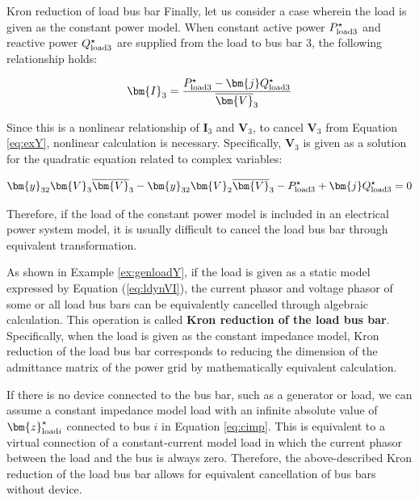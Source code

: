\documentclass[graybox, envcountchap]{svmult}
\begin{document}
\begin{example}{Kron reduction of load bus bar}
Finally, let us consider a case wherein the load is given as the constant power
model. When constant active power $P_{{\rm load}3}^{\star}$ and reactive
power $Q_{{\rm load}3}^{\star}$ are supplied from the load to bus bar 3, the
following relationship holds:

\begin{equation*}
  \bm{I}_3 = \frac{P_{{\rm load}3}^{\star} - \bm{j} Q_{{\rm load}3}^{\star} }{\overline{\bm{V}}_3}
\end{equation*}

Since this is a nonlinear relationship of $\bm{I}_3$ and $\bm{V}_3$, to cancel
$\bm{V}_3$ from Equation \ref{eq:exY}, nonlinear calculation is necessary.
Specifically, $\bm{V}_3$ is given as a solution for the quadratic equation
related to complex variables:

\begin{equation*}
  \bm{y}_{32} \bm{V}_3 \overline{\bm{V}}_3 - \bm{y}_{32}  \bm{V}_2 \overline{\bm{V}}_3 -P_{{\rm load}3}^{\star} 
  + \bm{j} Q_{{\rm load}3}^{\star} =0
\end{equation*}

Therefore, if the load of the constant power model is included in an electrical
power system model, it is usually difficult to cancel the load bus bar through
equivalent transformation.

\end{example}

As shown in Example \ref{ex:genloadY}, if the load is given as a static model
expressed by Equation (\ref{eq:ldynVI}), the current phasor and voltage phasor
of some or all load bus bars can be equivalently cancelled through algebraic
calculation. This operation is called \textbf{Kron reduction of the load bus
bar}. Specifically, when the load is given as the constant impedance model,
Kron reduction of the load bus bar corresponds to reducing the dimension of the
admittance matrix of the power grid by mathematically equivalent calculation.

If there is no device connected to the bus bar, such as a generator or load,
we can assume a constant impedance model load with an infinite absolute value of
$\bm{z}_{{\rm load}i}^{\star}$ connected to bus $i$ in Equation \ref{eq:cimp}.
This is equivalent to a virtual connection of a constant-current model load in
which the current phasor between the load and the bus is always zero. Therefore,
the above-described Kron reduction of the load bus bar allows for equivalent
cancellation of bus bars without device.
\end{document}
